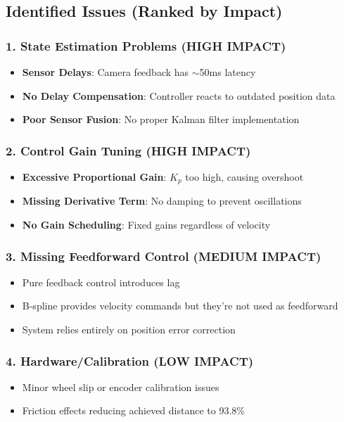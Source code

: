 \documentclass[12pt,a4paper]{article}
\begin{document}
\subsection{Identified Issues (Ranked by Impact)}

\subsubsection{1. State Estimation Problems (HIGH IMPACT)}
\begin{itemize}
    \item \textbf{Sensor Delays}: Camera feedback has $\sim$50ms latency
    \item \textbf{No Delay Compensation}: Controller reacts to outdated position data
    \item \textbf{Poor Sensor Fusion}: No proper Kalman filter implementation
\end{itemize}

\subsubsection{2. Control Gain Tuning (HIGH IMPACT)}
\begin{itemize}
    \item \textbf{Excessive Proportional Gain}: $K_p$ too high, causing overshoot
    \item \textbf{Missing Derivative Term}: No damping to prevent oscillations
    \item \textbf{No Gain Scheduling}: Fixed gains regardless of velocity
\end{itemize}

\subsubsection{3. Missing Feedforward Control (MEDIUM IMPACT)}
\begin{itemize}
    \item Pure feedback control introduces lag
    \item B-spline provides velocity commands but they're not used as feedforward
    \item System relies entirely on position error correction
\end{itemize}

\subsubsection{4. Hardware/Calibration (LOW IMPACT)}
\begin{itemize}
    \item Minor wheel slip or encoder calibration issues
    \item Friction effects reducing achieved distance to 93.8\%
\end{itemize}
\end{document}
